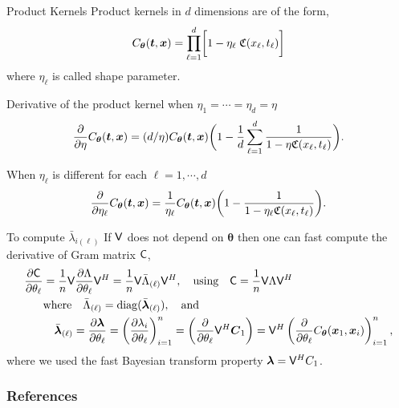\documentclass[handout, 10pt,compress,xcolor={usenames,dvipsnames}]{beamer} %
\newcommand{\bm}[1]{\boldsymbol{#1}}
\renewcommand{\mLambda}{\Lambda}
\newcommand{\vC}{\bvec{C}}
\renewcommand{\vtheta}{{\bm{\theta}}}
\begin{document}
\begin{frame}{Product Kernels}
	\vspace{-3ex}
	Product kernels in $d$ dimensions are of the form,
	\begin{align}
	\label{eqn:prod_kernel}
	C_{\vtheta}(\vt, \vx) = 
	\prod_{\ell=1}^d \biggl[ 1 - \eta_\ell \; \mathfrak{C}(x_\ell,t_\ell) \biggr]
	\end{align}
	where $\eta_\ell$ is called shape parameter.
	
	Derivative of the product kernel when $\eta_1=\cdots=\eta_d=\eta$
	\begin{align*}
	\frac{\partial}{\partial \eta} C_{\vtheta}(\vt, \vx) = ({d}/{\eta} ) C_{\vtheta}(\vt, \vx) 
	\biggl(
	1 - 
	\frac{1}{d} \sum_{\ell=1}^d
	\frac{1}
	{ 1 - \eta \mathfrak{C}(x_\ell,t_\ell) }
	\biggr).
	\end{align*}
	
	When $\eta_\ell$ is different for each $\ell = 1,\cdots,d$
	\begin{align*}
	\frac{\partial}{\partial \eta_\ell} C_{\vtheta}(\vt, \vx) = \frac{1}{\eta_\ell} 
	{ C_{\vtheta}(\vt, \vx) }
	\biggl(
	1 - 
	\frac{1}
	{ 1 - \eta_\ell \mathfrak{C}(x_\ell,t_\ell) }
	\biggr).
	\end{align*}
\end{frame}








\begin{frame}{To compute $\bar{\lambda}_{i(\ell)}$}
	If $\mathsf{V}$ does not depend on $\vtheta$ then one can fast compute the derivative of Gram matrix $\mathsf{C}$,
	\begin{align}
	\nonumber
	\displaystyle \frac{\partial \mC}{\partial \theta_\ell} 
	& = \frac 1n \mV \frac{\partial {\mLambda}}{\partial \theta_\ell} \mV^H
	= \frac 1n \mV \bar{\mLambda}_{(\ell)} \mV^H, \quad
	\text{using} \quad  \mC = \frac 1n \mV \mLambda \mV^H
	\\
	\nonumber
	& \text{where} \quad \bar{\mLambda}_{(\ell)} = \diag(\bar{\vlambda}_{(\ell)}), \quad \text{and}
	\\
	\label{eqn:deriv_eigenval_gram_matrix}
	&  \quad \bar{\vlambda}_{(\ell)} = \frac{\partial \vlambda}{\partial \theta_\ell} = \left( \frac{\partial \lambda_i}{\partial \theta_\ell} \right)_{i=1}^n 
	= \left( \frac{\partial }{\partial \theta_\ell} \mV^H {\vC_1} \right)
	= \mV^H \left( \frac{\partial }{\partial \theta_\ell} {C_\vtheta(\vx_1,\vx_i)} \right)_{i=1}^n,
	\end{align}
	where we used the fast Bayesian transform property $\boldsymbol{\lambda} = \mathsf{V}^H C_1$. %
\end{frame}












\begin{frame}[allowframebreaks]
	\frametitle{References}
	
	{}
\end{frame}
\end{document}
